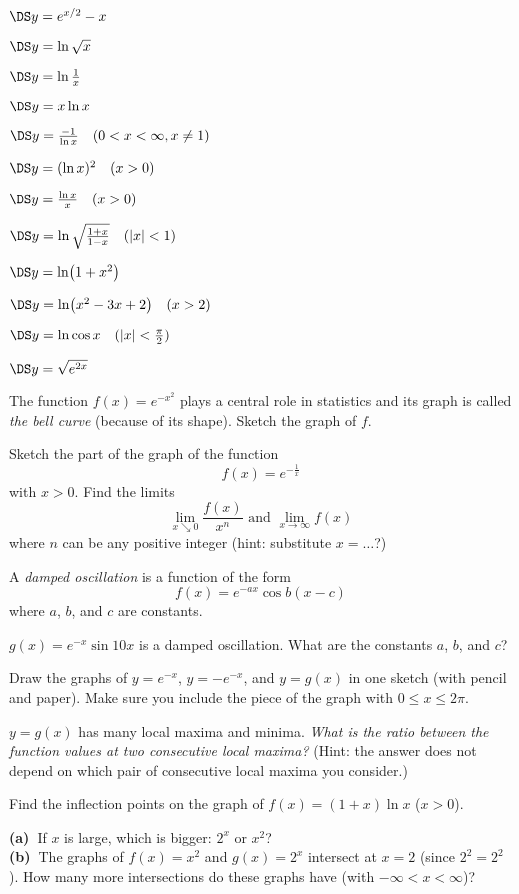 \begin{multicols}{2}
\problem $\DS y= e^{x/2}-x$

\problem $\DS y= \ln \sqrt x $

\problem $\DS y= \ln \frac1 x $

\problem $\DS y= x\ln x $

\problem $\DS y= \frac{-1}{\ln x}  \quad(0<x<\infty, x\neq1)$

\problem $\DS y= (\ln x)^2  \quad(x>0)$

\problem $\DS y= \frac{\ln x}{x} \quad(x>0)$

\problem $\DS y=\ln \sqrt{\frac{1+x}{1-x}} \quad(|x|<1)$

\problem $\DS y= \ln \bigl(1+x^2\bigr) $

\problem $\DS y= \ln \bigl(x^2-3x+2\bigr) \quad (x>2) $

\problem $\DS y= \ln\cos x\quad (|x|< \tfrac{\pi}{2})$

\problem $\DS y = \sqrt{e^{2x}}$

\problem The function $f(x) = e^{-x^2}$ plays a central role in
statistics and its graph is called \emph{the bell curve} (because of its
shape).  Sketch the graph of $f$.

\problem Sketch the part of the graph of the function
\[
f(x) = e^{-\frac1x}
\]
with $x>0$.
Find the limits
\[
\lim_{x\searrow 0} \frac{f(x)}{x^n} 
\text{ and }
\lim_{x \to\infty} f(x)
\]
where $n$ can be any positive integer (hint: substitute $x=\ldots$?)

\problem A \emph{damped oscillation} is a function of the form 
\[
f(x) = e^{-ax} \cos b(x-c) 
\]
where $a$, $b$, and $c$ are constants.

\subprob $g(x) = e^{-x} \sin 10x$ is a damped oscillation.  What are
the constants $a$, $b$, and $c$?

\subprob Draw the graphs of $y=e^{-x}$, $y=-e^{-x}$, and $y=g(x)$
in one sketch (with pencil and paper).  Make sure you include the
piece of the graph with $0\leq x\leq 2\pi$.

\subprob $y=g(x)$ has many local maxima and minima.  
\textit{What is the ratio between the function values at two consecutive
  local maxima?}  (Hint: the answer does not depend on which pair of
consecutive local maxima you consider.)


\problem Find the inflection points on the graph of $f(x) = (1+x)\ln x$ ($x>0$).



\problem \textbf{(a)~}If $x$ is large, which is bigger: $2^x$ or $x^2$?\\ 
\textbf{(b)~}The graphs of $f(x) = x^2$ and $g(x) = 2^x$ intersect at $x=2$
(since $2^2=2^2$).  How many more intersections do these graphs have (with
$-\infty < x < \infty$)?


\end{multicols}
